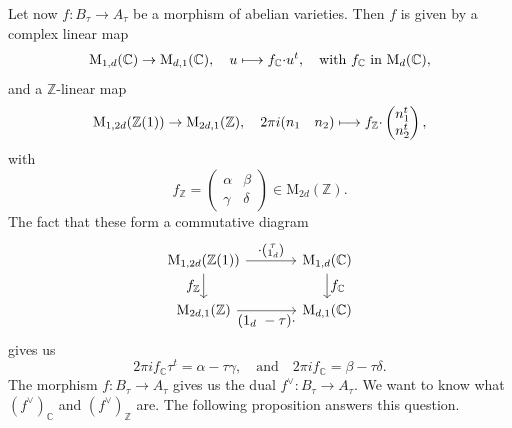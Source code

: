 \documentclass[11pt]{article}
\providecommand{\C}{}
\def\mto{\mathchoice{\longmapsto}{\mapsto}{\mapsto}{\mapsto}}
\let\oldvee\vee
\renewcommand{\vee}{{\scriptscriptstyle\oldvee}}
\theoremstyle{plain}
\theoremstyle{definition}
\numberwithin{equation}{subsection}
\renewcommand{\C}{\mathbb C}
\newcommand{\Z}{\mathbb Z}
\newcommand{\rmM}{\mathrm{M}}
\begin{document}
Let now $f\colon B_\tau\to A_\tau$ be a morphism of abelian
varieties. Then $f$ is given by a complex linear map
\[
\rmM_{1,d}(\C) \to \rmM_{d,1}(\C),\quad u\mto f_\C{\cdot}u^t,
\quad\text{with $f_\C$ in $\rmM_d(\C)$},
\]
and a $\Z$-linear map
\[
\rmM_{1,2d}(\Z(1)) \to \rmM_{2d,1}(\Z),\quad
2\pi i (\begin{matrix} n_1 & n_2\end{matrix})\mto
f_\Z{\cdot}\begin{pmatrix} n_1^t\\ n_2^t\end{pmatrix},
\]
with
\[
f_\Z =
\begin{pmatrix} \alpha & \beta \\\gamma & \delta\end{pmatrix}
\in\rmM_{2d}(\Z).
\]
The fact that these form a commutative diagram
\[
\begin{tikzcd}[column sep = large]
\rmM_{1,2d}(\Z(1)) \ar[r,"\textstyle{\cdot}(\substack{\tau\\ 1_d})"]
\ar[d,"\textstyle f_\Z"'] & \rmM_{1,d}(\C) \ar[d,"\textstyle f_\C"]\\
\rmM_{2d,1}(\Z)\ar[r, "\textstyle(1_d\ -\tau){\cdot}"'] & \rmM_{d,1}(\C)
\end{tikzcd}
\]
gives us
\begin{equation}\label{eq:fC_andf_Z}
2\pi i f_\C\tau^t = \alpha-\tau\gamma,\quad\text{and}\quad
2\pi i f_\C = \beta-\tau\delta.
\end{equation}
The morphism $f\colon B_\tau\to A_\tau$ gives us the dual
$f^\vee\colon B_\tau\to A_\tau$. We want to know what $(f^\vee)_\C$
and $(f^\vee)_\Z$ are. The following proposition answers this
question.
\end{document}
